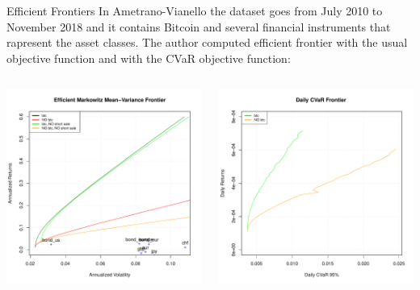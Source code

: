 \documentclass[aspectratio=169]{beamer}
\begin{document}
\begin{frame}{Efficient Frontiers}
	In Ametrano-Vianello \cite{samuele} the dataset goes from July 2010 to November 2018 and it contains Bitcoin and several financial instruments that rapresent the asset classes. The author computed  efficient frontier with the usual objective function and with the CVaR objective function:
	\begin{columns}
		\begin{column}{0.34\textwidth}
			\includegraphics[width=\textwidth]{Images/efficient_frontier}
		\end{column}
		\begin{column}{0.34\textwidth}  %
			\includegraphics[width=\textwidth]{Images/efficient_frontier_CVaR}

\end{column}
\end{columns}
\end{frame}
\end{document}
